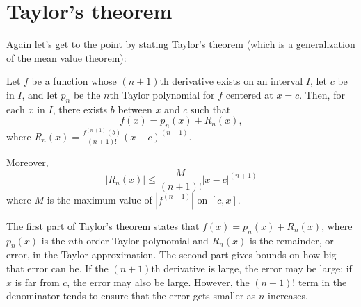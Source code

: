 \documentclass{ximera}
\begin{document}
\section{Taylor's theorem}

Again let's get to the point by stating Taylor's theorem (which is a
generalization of the mean value theorem):

\begin{theorem}
Let $f$ be a function whose $(n+1)$th derivative exists on an interval
$I$, let $c$ be in $I$, and let $p_n$ be the $n$th Taylor polynomial
for $f$ centered at $x=c$. Then, for each $x$ in $I$, there exists $b$
between $x$ and $c$ such that
\[
f(x) = p_n(x) + R_n(x),
\]
where $R_n(x) = \frac{f^{(n+1)}(b)}{(n+1)!}(x-c)^{(n+1)}$.
\begin{image}
\end{image}
Moreover,
\[
\left|R_n(x)\right| \leq \frac{M}{(n+1)!}|x-c|^{(n+1)}
\]
where $M$ is the maximum value of $|f^{(n+1)}|$ on $[c,x]$.
\end{theorem}

The first part of Taylor's theorem states that $f(x) = p_n(x) +
R_n(x)$, where $p_n(x)$ is the $n$th order Taylor polynomial and
$R_n(x)$ is the remainder, or error, in the Taylor approximation. The
second part gives bounds on how big that error can be. If the
$(n+1)$th derivative is large, the error may be large; if $x$ is far
from $c$, the error may also be large. However, the $(n+1)!$ term in
the denominator tends to ensure that the error gets smaller as $n$
increases. 
\end{document}
